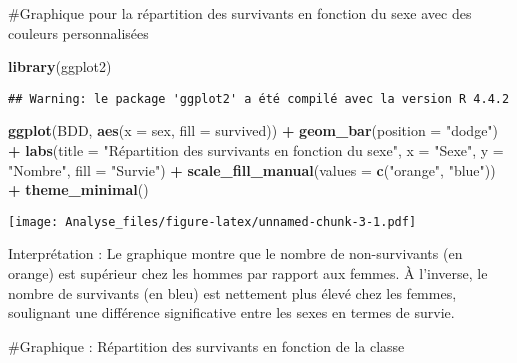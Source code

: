 \documentclass[
]{article}
\newenvironment{Shaded}{\begin{snugshade}}{\end{snugshade}}
\newcommand{\AttributeTok}[1]{\textcolor[rgb]{0.13,0.29,0.53}{#1}}
\newcommand{\FunctionTok}[1]{\textcolor[rgb]{0.13,0.29,0.53}{\textbf{#1}}}
\newcommand{\NormalTok}[1]{#1}
\newcommand{\SpecialCharTok}[1]{\textcolor[rgb]{0.81,0.36,0.00}{\textbf{#1}}}
\newcommand{\StringTok}[1]{\textcolor[rgb]{0.31,0.60,0.02}{#1}}
\begin{document}
\#Graphique pour la répartition des survivants en fonction du sexe avec
des couleurs personnalisées

\begin{Shaded}
\begin{Highlighting}[]
\FunctionTok{library}\NormalTok{(ggplot2)}
\end{Highlighting}
\end{Shaded}

\begin{verbatim}
## Warning: le package 'ggplot2' a été compilé avec la version R 4.4.2
\end{verbatim}

\begin{Shaded}
\begin{Highlighting}[]
\FunctionTok{ggplot}\NormalTok{(BDD, }\FunctionTok{aes}\NormalTok{(}\AttributeTok{x =}\NormalTok{ sex, }\AttributeTok{fill =}\NormalTok{ survived)) }\SpecialCharTok{+}
  \FunctionTok{geom\_bar}\NormalTok{(}\AttributeTok{position =} \StringTok{"dodge"}\NormalTok{) }\SpecialCharTok{+}
  \FunctionTok{labs}\NormalTok{(}\AttributeTok{title =} \StringTok{"Répartition des survivants en fonction du sexe"}\NormalTok{,}
       \AttributeTok{x =} \StringTok{"Sexe"}\NormalTok{,}
       \AttributeTok{y =} \StringTok{"Nombre"}\NormalTok{,}
       \AttributeTok{fill =} \StringTok{"Survie"}\NormalTok{) }\SpecialCharTok{+}
  \FunctionTok{scale\_fill\_manual}\NormalTok{(}\AttributeTok{values =} \FunctionTok{c}\NormalTok{(}\StringTok{"orange"}\NormalTok{, }\StringTok{"blue"}\NormalTok{)) }\SpecialCharTok{+}
  \FunctionTok{theme\_minimal}\NormalTok{()}
\end{Highlighting}
\end{Shaded}

\texttt{[image: Analyse\_files/figure-latex/unnamed-chunk-3-1.pdf]}

Interprétation : Le graphique montre que le nombre de non-survivants (en
orange) est supérieur chez les hommes par rapport aux femmes. À
l'inverse, le nombre de survivants (en bleu) est nettement plus élevé
chez les femmes, soulignant une différence significative entre les sexes
en termes de survie.

\#Graphique : Répartition des survivants en fonction de la classe
\end{document}
